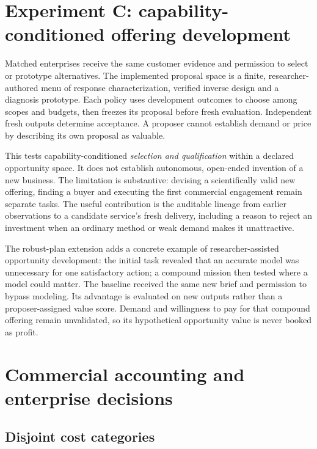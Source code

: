 \documentclass[11pt,letterpaper]{article}
\begin{document}
\section{Experiment C: capability-conditioned offering development}

Matched enterprises receive the same customer evidence and permission to select or prototype alternatives. The implemented proposal space is a finite, researcher-authored menu of response characterization, verified inverse design and a diagnosis prototype. Each policy uses development outcomes to choose among scopes and budgets, then freezes its proposal before fresh evaluation. Independent fresh outputs determine acceptance. A proposer cannot establish demand or price by describing its own proposal as valuable.



This tests capability-conditioned \emph{selection and qualification} within a declared opportunity space. It does not establish autonomous, open-ended invention of a new business. The limitation is substantive: devising a scientifically valid new offering, finding a buyer and executing the first commercial engagement remain separate tasks. The useful contribution is the auditable lineage from earlier observations to a candidate service's fresh delivery, including a reason to reject an investment when an ordinary method or weak demand makes it unattractive.

The robust-plan extension adds a concrete example of researcher-assisted opportunity development: the initial task revealed that an accurate model was unnecessary for one satisfactory action; a compound mission then tested where a model could matter. The baseline received the same new brief and permission to bypass modeling. Its advantage is evaluated on new outputs rather than a proposer-assigned value score. Demand and willingness to pay for that compound offering remain unvalidated, so its hypothetical opportunity value is never booked as profit.

\section{Commercial accounting and enterprise decisions}

\subsection{Disjoint cost categories}
\end{document}
